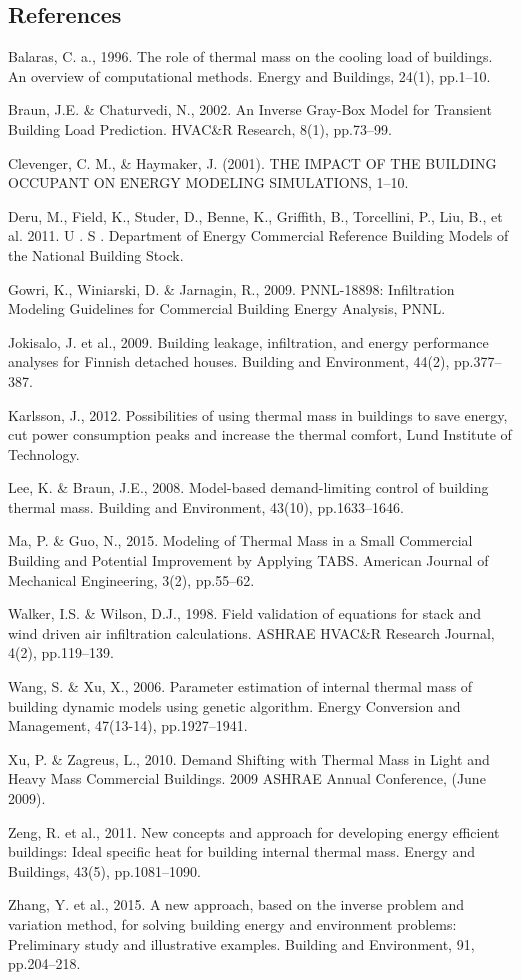 \documentclass[11pt]{article}
\begin{document}
\subsection{References}\label{references}

Balaras, C. a., 1996. The role of thermal mass on the cooling load of buildings. An overview of computational methods. Energy and Buildings, 24(1), pp.1–10.

Braun, J.E. \& Chaturvedi, N., 2002. An Inverse Gray-Box Model for Transient Building Load Prediction. HVAC\&R Research, 8(1), pp.73–99.

Clevenger, C. M., \& Haymaker, J. (2001). THE IMPACT OF THE BUILDING OCCUPANT ON ENERGY MODELING SIMULATIONS, 1–10.

Deru, M., Field, K., Studer, D., Benne, K., Griffith, B., Torcellini, P., Liu, B., et al. 2011. U . S . Department of Energy Commercial Reference Building Models of the National Building Stock.

Gowri, K., Winiarski, D. \& Jarnagin, R., 2009. PNNL-18898: Infiltration Modeling Guidelines for Commercial Building Energy Analysis, PNNL.

Jokisalo, J. et al., 2009. Building leakage, infiltration, and energy performance analyses for Finnish detached houses. Building and Environment, 44(2), pp.377–387.

Karlsson, J., 2012. Possibilities of using thermal mass in buildings to save energy, cut power consumption peaks and increase the thermal comfort, Lund Institute of Technology.

Lee, K. \& Braun, J.E., 2008. Model-based demand-limiting control of building thermal mass. Building and Environment, 43(10), pp.1633–1646.

Ma, P. \& Guo, N., 2015. Modeling of Thermal Mass in a Small Commercial Building and Potential Improvement by Applying TABS. American Journal of Mechanical Engineering, 3(2), pp.55–62.

Walker, I.S. \& Wilson, D.J., 1998. Field validation of equations for stack and wind driven air infiltration calculations. ASHRAE HVAC\&R Research Journal, 4(2), pp.119–139.

Wang, S. \& Xu, X., 2006. Parameter estimation of internal thermal mass of building dynamic models using genetic algorithm. Energy Conversion and Management, 47(13-14), pp.1927–1941.

Xu, P. \& Zagreus, L., 2010. Demand Shifting with Thermal Mass in Light and Heavy Mass Commercial Buildings. 2009 ASHRAE Annual Conference, (June 2009).

Zeng, R. et al., 2011. New concepts and approach for developing energy efficient buildings: Ideal specific heat for building internal thermal mass. Energy and Buildings, 43(5), pp.1081–1090.

Zhang, Y. et al., 2015. A new approach, based on the inverse problem and variation method, for solving building energy and environment problems: Preliminary study and illustrative examples. Building and Environment, 91, pp.204–218.



\end{document}
